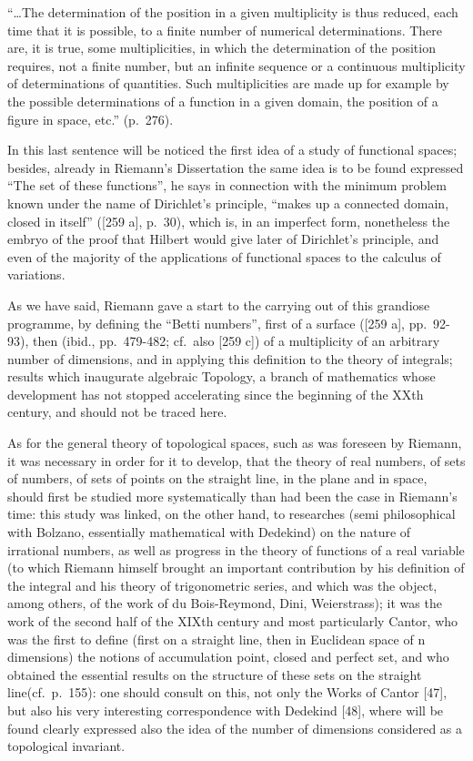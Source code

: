 ``\ldots The determination of the position in a given multiplicity is thus reduced, each time that it is possible, to a finite number of numerical determinations. There are, it is true, some multiplicities, in which the determination of the position requires, not a finite number, but an infinite sequence or a continuous multiplicity of determinations of quantities. Such multiplicities are made up for example by the possible determinations of a function in a given domain, the position of a figure in space, etc.'' (p.~276).

In this last sentence will be noticed the first idea of a study of functional spaces; besides, already in Riemann's Dissertation the same idea is to be found expressed ``The set of these functions'', he says in connection with the minimum problem known under the name of Dirichlet's principle, ``makes up a connected domain, closed in itself'' ({[}259 a{]}, p.~30), which is, in an imperfect form, nonetheless the embryo of the proof that Hilbert would give later of Dirichlet's principle, and even of the majority of the applications of functional spaces to the calculus of variations.

As we have said, Riemann gave a start to the carrying out of this grandiose programme, by defining the ``Betti numbers'', first of a surface ({[}259 a{]}, pp.~92-93), then (ibid., pp.~479-482; cf.~also {[}259 c{]}) of a multiplicity of an arbitrary number of dimensions, and in applying this definition to the theory of integrals; results which inaugurate algebraic Topology, a branch of mathematics whose development has not stopped accelerating since the beginning of the XXth century, and should not be traced here.

As for the general theory of topological spaces, such as was foreseen by Riemann, it was necessary in order for it to develop, that the theory of real numbers, of sets of numbers, of sets of points on the straight line, in the plane and in space, should first be studied more systematically than had been the case in Riemann's time: this study was linked, on the other hand, to researches (semi philosophical with Bolzano, essentially mathematical with Dedekind) on the nature of irrational numbers, as well as progress in the theory of functions of a real variable (to which Riemann himself brought an important contribution by his definition of the integral and his theory of trigonometric series, and which was the object, among others, of the work of du Bois-Reymond, Dini, Weierstrass); it was the work of the second half of the XIXth century and most particularly Cantor, who was the first to define (first on a straight line, then in Euclidean space of n dimensions) the notions of accumulation point, closed and perfect set, and who obtained the essential results on the structure of these sets on the straight line(cf.~p.~155): one should consult on this, not only the Works of Cantor {[}47{]}, but also his very interesting correspondence with Dedekind {[}48{]}, where will be found clearly expressed also the idea of the number of dimensions considered as a topological invariant.

